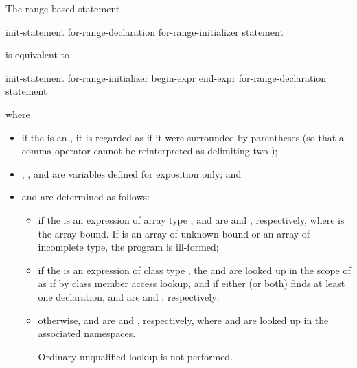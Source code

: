 \pnum
The range-based  statement

\begin{ncbnf}
 init-statement\opt{} for-range-declaration \terminal{:} for-range-initializer \terminal{)} statement
\end{ncbnf}

is equivalent to

\begin{ncbnftab}
\terminal{\{}\br
\>init-statement\opt{}\br
\> for-range-initializer \terminal{;}\br
\> begin-expr \terminal{;}\br
\> end-expr \terminal{;}\br
\>\br
\>\>for-range-declaration \br
\>\>statement\br
\>\terminal{\}}\br
\terminal{\}}
\end{ncbnftab}

where

\begin{itemize}
\item
if the  is an ,
it is regarded as if it were surrounded by parentheses (so that a comma operator
cannot be reinterpreted as delimiting two );

\item {}, , and  are variables defined for
exposition only; and

\item
{} and  are determined as follows:

\begin{itemize}
\item if the  is an expression of
array type ,  and  are
 and , respectively, where  is
the array bound. If  is an array of unknown bound or an array of
incomplete type, the program is ill-formed;

\item if the  is an expression of
class type , the 
 and  are looked up in the scope of 
as if by class member access lookup, and if either
(or both) finds at least one declaration,  and
 are  and ,
respectively;

\item otherwise,  and  are 
and , respectively, where  and  are looked
up in the associated namespaces.
\begin{note} Ordinary unqualified lookup is not
performed. \end{note}
\end{itemize}
\end{itemize}

